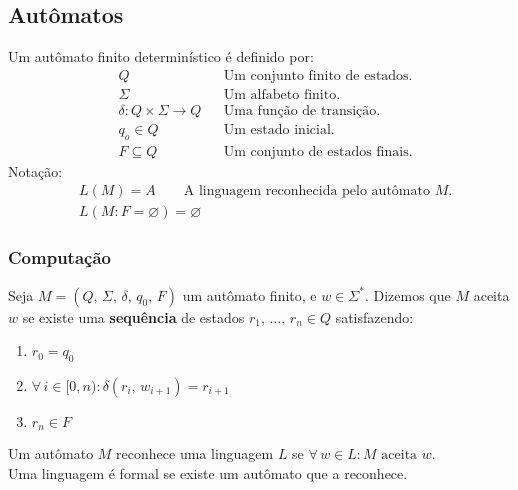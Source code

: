 \documentclass[11pt]{article}
\begin{document}
\subsection{Autômatos}
\label{sec:orgcbddc2a}
Um autômato finito determinístico é definido por:
\begin{align*}
  & Q && \text{Um conjunto finito de estados.} \\
  & \Sigma && \text{Um alfabeto finito.} \\
  & \delta: Q \times \Sigma \to Q && \text{Uma função de transição.} \\
  & q_o \in Q && \text{Um estado inicial.} \\
  & F \subseteq Q && \text{Um conjunto de estados finais.}
\end{align*}
Notação:
\begin{align*}
  & L(M) = A \qquad \text{A linguagem reconhecida pelo autômato $M$.} \\[5pt]
  & L(M: F = \varnothing) = \varnothing
\end{align*}
\subsubsection{Computação}
\label{sec:orgad4b725}
Seja \(M = (Q,\, \Sigma,\, \delta,\, q_0,\, F)\) um autômato finito, e \(w \in \Sigma^*\).
Dizemos que \(M\) aceita \(w\) se existe uma \textbf{sequência} de estados
\(r_1, \,\hdots,\, r_n \in Q\) satisfazendo:
\begin{enumerate}
\item \(r_0 = q_0\)
\item \(\forall\, i \in [0, n): \delta(r_i,\, w_{i + 1}) = r_{i + 1}\)
\item \(r_n \in F\)
\end{enumerate}
Um autômato \(M\) reconhece uma linguagem \(L\) se \(\forall\, w \in L: M \text{ aceita } w\). \\
Uma linguagem é formal se existe um autômato que a reconhece.
\end{document}
